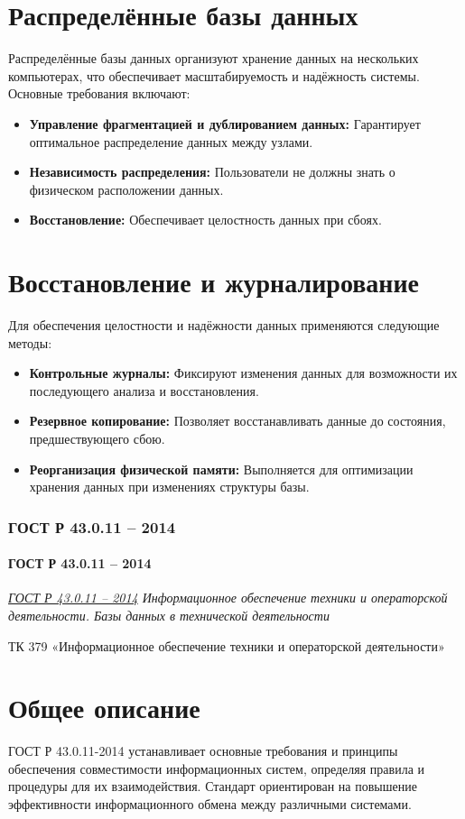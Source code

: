 \section*{Распределённые базы данных}
Распределённые базы данных организуют хранение данных на нескольких компьютерах, что обеспечивает масштабируемость и надёжность системы. Основные требования включают:
\begin{itemize}
    \item \textbf{Управление фрагментацией и дублированием данных:} Гарантирует оптимальное распределение данных между узлами.
    \item \textbf{Независимость распределения:} Пользователи не должны знать о физическом расположении данных.
    \item \textbf{Восстановление:} Обеспечивает целостность данных при сбоях.
\end{itemize}

\section*{Восстановление и журналирование}
Для обеспечения целостности и надёжности данных применяются следующие методы:
\begin{itemize}
    \item \textbf{Контрольные журналы:} Фиксируют изменения данных для возможности их последующего анализа и восстановления.
    \item \textbf{Резервное копирование:} Позволяет восстанавливать данные до состояния, предшествующего сбою.
    \item \textbf{Реорганизация физической памяти:} Выполняется для оптимизации хранения данных при изменениях структуры базы.
\end{itemize}

\subsubsection{ГОСТ Р 43.0.11 -- 2014}
\paragraph{ГОСТ Р 43.0.11 -- 2014}
\emph{\href{https://internet-law.ru/gosts/gost/57862/}{ГОСТ Р 43.0.11 -- 2014}
Информационное обеспечение техники и операторской деятельности.
Базы данных в технической деятельности
}
\par
ТК 379 «Информационное обеспечение
техники и операторской деятельности»
\section*{Общее описание}
ГОСТ Р 43.0.11-2014 устанавливает основные требования и принципы обеспечения совместимости информационных систем, определяя правила и процедуры для их взаимодействия. Стандарт ориентирован на повышение эффективности информационного обмена между различными системами.

